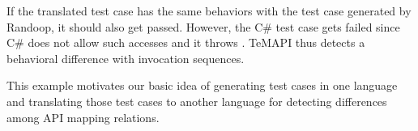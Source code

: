If the translated test case has the same behaviors with the test case generated by Randoop, it should also get passed. However, the C\# test case gets failed since C\# does not allow such accesses and it throws . TeMAPI thus detects a behavioral difference with invocation sequences.

This example motivates our basic idea of generating test cases in one language and translating those test cases to another language for detecting differences among API mapping relations. %


